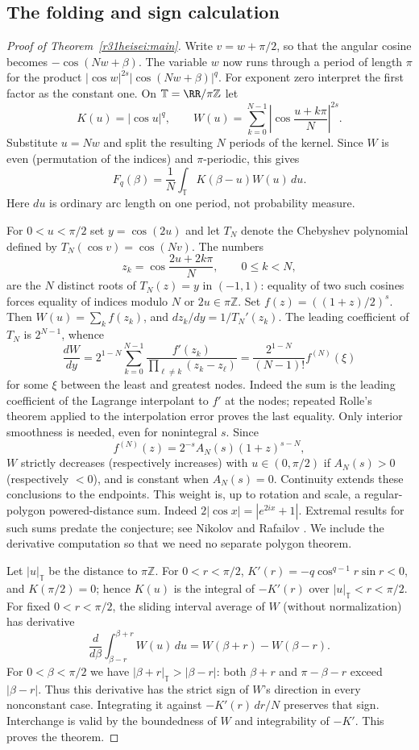 \documentclass[11pt,a4paper]{article}
\numberwithin{equation}{section}
\theoremstyle{definition}
\theoremstyle{remark}
\begin{document}
\subsection{The folding and sign calculation}
\begin{proof}[Proof of Theorem~\ref{r31heisei:main}]
Write $v=w+\pi/2$, so that the angular cosine becomes $-\cos(Nw+\beta)$. The variable $w$ now runs through a period of length $\pi$ for the product $|\cos w|^{2s}|\cos(Nw+\beta)|^q$. For exponent zero interpret the first factor as the constant one. On $\mathbb T=\RR/\pi\mathbb Z$ let
\[
 K(u)=|\cos u|^q,\qquad W(u)=\sum_{k=0}^{N-1}
 \left|\cos\frac{u+k\pi}{N}\right|^{2s}.
\]
Substitute $u=Nw$ and split the resulting $N$ periods of the kernel. Since $W$ is even (permutation of the indices) and $\pi$-periodic, this gives
\[
 F_q(\beta)=\frac1N\int_{\mathbb T}K(\beta-u)W(u)\,du.
\]
Here $du$ is ordinary arc length on one period, not probability measure.

For $0<u<\pi/2$ set $y=\cos(2u)$ and let $T_N$ denote the Chebyshev polynomial defined by $T_N(\cos v)=\cos(Nv)$. The numbers
\[
 z_k=\cos\frac{2u+2k\pi}{N},\qquad 0\le k<N,
\]
are the $N$ distinct roots of $T_N(z)=y$ in $(-1,1)$: equality of two such cosines forces equality of indices modulo $N$ or $2u\in\pi\mathbb Z$. Set $f(z)=((1+z)/2)^s$. Then $W(u)=\sum_k f(z_k)$, and $dz_k/dy=1/T_N'(z_k)$. The leading coefficient of $T_N$ is $2^{N-1}$, whence
\[
 \frac{dW}{dy}=2^{1-N}\sum_{k=0}^{N-1}
 \frac{f'(z_k)}{\prod_{\ell\ne k}(z_k-z_\ell)}
 = \frac{2^{1-N}}{(N-1)!} f^{(N)}(\xi)
\]
for some $\xi$ between the least and greatest nodes. Indeed the sum is the leading coefficient of the Lagrange interpolant to $f'$ at the nodes; repeated Rolle's theorem applied to the interpolation error proves the last equality. Only interior smoothness is needed, even for nonintegral $s$. Since
\[
 f^{(N)}(z)=2^{-s}A_N(s)(1+z)^{s-N},
\]
$W$ strictly decreases (respectively increases) with $u\in(0,\pi/2)$ if $A_N(s)>0$ (respectively $<0$), and is constant when $A_N(s)=0$. Continuity extends these conclusions to the endpoints. This weight is, up to rotation and scale, a regular-polygon powered-distance sum. Indeed $2|\cos x|=|e^{2ix}+1|$. Extremal results for such sums predate the conjecture; see Nikolov and Rafailov \cite{r31heisei:NR}. We include the derivative computation so that we need no separate polygon theorem.

Let $|u|_{\mathbb T}$ be the distance to $\pi\mathbb Z$. For $0<r<\pi/2$, $K'(r)=-q\cos^{q-1}r\sin r<0$, and $K(\pi/2)=0$; hence $K(u)$ is the integral of $-K'(r)$ over $|u|_{\mathbb T}<r<\pi/2$. For fixed $0<r<\pi/2$, the sliding interval average of $W$ (without normalization) has derivative
\[
 \frac{d}{d\beta}\int_{\beta-r}^{\beta+r}W(u)\,du
 =W(\beta+r)-W(\beta-r).
\]
For $0<\beta<\pi/2$ we have $|\beta+r|_{\mathbb T}>|\beta-r|$:
both $\beta+r$ and $\pi-\beta-r$ exceed $|\beta-r|$. Thus this derivative has the strict sign of $W$'s direction in every nonconstant case. Integrating it against $-K'(r)\,dr/N$ preserves that sign. Interchange is valid by the boundedness of $W$ and integrability of $-K'$. This proves the theorem.
\end{proof}
\end{document}
